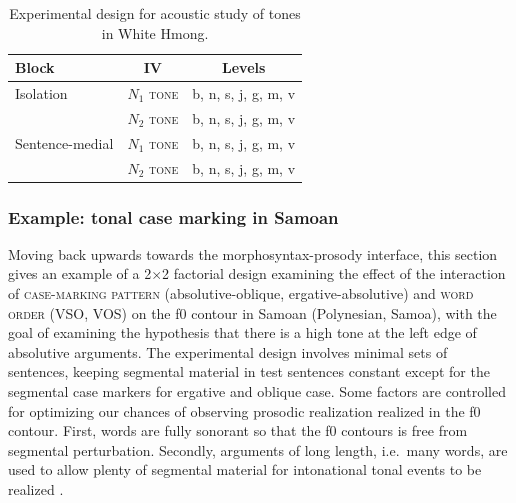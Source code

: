 \documentclass[12pt]{article}
\begin{document}
\begin{table}[!h]
  \centering
  \begin{tabular}{l | c c}
    Block & IV  & Levels\\\hline
    Isolation & $N_1$ \textsc{tone} & b, n, s, j, g, m, v\\
     & $N_2$ \textsc{tone} & b, n, s, j, g, m, v\\\hline
    Sentence-medial & $N_1$ \textsc{tone} & b, n, s, j, g, m, v\\
     & $N_2$ \textsc{tone} & b, n, s, j, g, m, v\\\hline
  \end{tabular}
  \caption{Experimental design for acoustic study of tones in White Hmong.}
  \label{tab:hmong}
\end{table}

\subsubsection{Example: tonal case marking in Samoan}
\label{sec:samoan-abs}

Moving back upwards towards the morphosyntax-prosody interface, this
section gives an example of a 2$\times$2 factorial design examining the effect
of the
interaction of \textsc{case-marking pattern} (absolutive-oblique,
ergative-absolutive) and \textsc{word order} (VSO, VOS) on the f0 contour
in Samoan (Polynesian, Samoa), with the goal of examining the
hypothesis that there is a high tone at the left edge of absolutive
arguments. The experimental design involves minimal sets of sentences, keeping
segmental material in test sentences constant except for the segmental
case markers for ergative and oblique case. Some factors are
controlled for optimizing our chances of observing prosodic
realization realized in the f0 contour. First, words are fully
sonorant so that the f0 contours is free from segmental
perturbation. Secondly, arguments of long length, i.e.\ many words,
are used to allow plenty of segmental material for intonational tonal
events to be realized \citep{Bruce:1977}.
 
\end{document}
